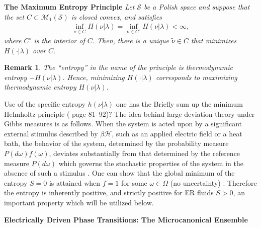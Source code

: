 \documentclass[english,12pt]{ttuthes}
\newtheorem{remark}{Remark}[chapter]
\newcommand{\Hc}{\mathcal{H}}
\begin{document}
% 
\noindent\textbf{The Maximum Entropy Principle} \textit{Let $\mathcal{S}$ be a
Polish space and suppose that the set $C\subset\mathcal{M}_1(\mathcal{S})$
is closed convex, and satisfies}
%
\begin{align}
  \inf_{\nu\in C}H(\nu|\lambda)=\inf_{\nu\in C^\circ}H(\nu|\lambda)<\infty,
\end{align}
%
\textit{where $C^\circ$ is the interior of $C$. Then, there is a unique
$\tilde{\nu}\in C$ that minimizes $H(\cdot|\lambda)$ over $C$}.
%
\begin{remark}
  The ``entropy'' in the name of the principle is thermodynamic
  entropy $-H(\nu|\lambda)$. Hence, minimizing $H(\cdot|\lambda)$ corresponds to
  maximizing thermodynamic entropy $H(\nu|\lambda)$.
\end{remark}
%
Use of the specific entropy $h(\nu|\lambda)$ one has the 
Briefly sum up the minimum Helmholtz principle (\cite{Firas}
page 81--92)?
The idea behind large deviation theory under Gibbs measures is as
follows. When the system is acted upon by a significant external
stimulus described by $\beta\Hc$, such as an applied electric
field or a heat bath, the behavior of the system, determined by the
probability measure $P(d\omega)f(\omega)$, deviates substantially from that
determined by the reference measure $P(d\omega)$ which governs the
stochastic properties of the system in the absence of such a stimulus  
\cite{Firas}. One can show that the global minimum of the entropy
$S=0$ is attained when $f=1$ for some $\omega\in\Omega$ (no uncertainty)
\cite{Sethna-2006,Firas}. Therefore the entropy is inherently positive, and
strictly positive for ER fluids $S>0$, an important property which
will be utilized below.  

%


\textbf{Electrically Driven Phase Transitions: The Microcanonical
  Ensemble}

\end{document}
